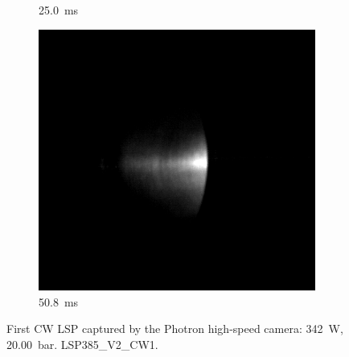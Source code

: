 \begin{figure}[!ht]
\begin{subfigure}[t]{0.3\textwidth}
        \caption{\qty{25.0}{ms}}
    \end{subfigure}
    \hfill
    \begin{subfigure}[t]{0.3\textwidth}
        \centering
        \includegraphics[width=\textwidth]{assets/4 experiments/CW LSP frames Photron/LSP385_V2_CW1_Fr508.png}
        \caption{\qty{50.8}{ms}}
    \end{subfigure}
    \caption{First CW LSP captured by the Photron high-speed camera: \qty{342}{W}, \qty{20.00}{bar}. LSP385\_V2\_CW1.}
    \label{fig:CW_V2_Photron_frames}
\end{figure}

